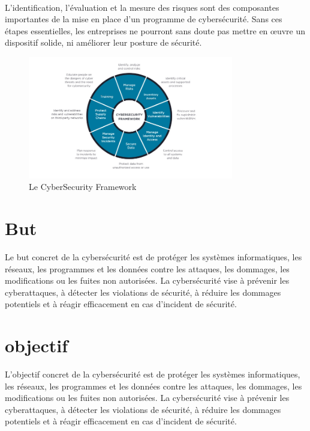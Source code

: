  \paragraph{ }
  L’identification, l’évaluation et la mesure des risques sont des composantes importantes de la mise en place d’un programme de cybersécurité. Sans ces étapes essentielles, les entreprises ne pourront sans doute pas mettre en œuvre un dispositif solide, ni améliorer leur posture de sécurité.
  \begin{figure}[h]
  	 \begin{center}
  	 		\includegraphics[width=0.8\textwidth]{PhotoMemoire/image_oeuvre.png}
  	 		\caption{Le CyberSecurity Framework }
  	 \end{center}
  \end{figure}
  
 \section{But}
 Le but concret de la cybersécurité est de protéger les systèmes informatiques, les réseaux, les programmes et les données contre les attaques, les dommages, les modifications ou les fuites non autorisées. La cybersécurité vise à prévenir les cyberattaques, à détecter les violations de sécurité, à réduire les dommages potentiels et à réagir efficacement en cas d'incident de sécurité.\\
 \section{objectif}
 L'objectif concret de la cybersécurité est de protéger les systèmes informatiques, les réseaux, les programmes et les données contre les attaques, les dommages, les modifications ou les fuites non autorisées. La cybersécurité vise à prévenir les cyberattaques, à détecter les violations de sécurité, à réduire les dommages potentiels et à réagir efficacement en cas d'incident de sécurité.\\
